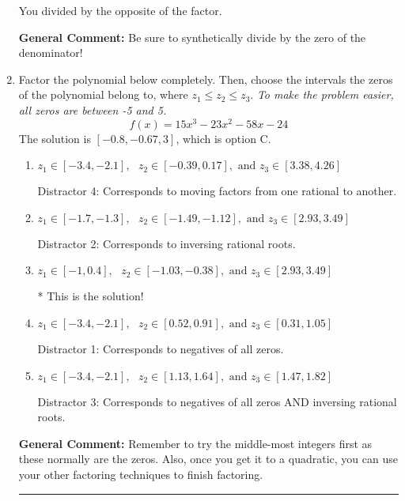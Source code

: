 \documentclass{extbook}[14pt]
\newcommand{\litem}[1]{\item #1

\rule{\textwidth}{0.4pt}}
\begin{document}
\begin{enumerate}
{\begin{enumerate}[label=\Alph*.]
 You divided by the opposite of the factor.
\end{enumerate}

\textbf{General Comment:} Be sure to synthetically divide by the zero of the denominator!
}
\litem{
Factor the polynomial below completely. Then, choose the intervals the zeros of the polynomial belong to, where $z_1 \leq z_2 \leq z_3$. \textit{To make the problem easier, all zeros are between -5 and 5.}
\[ f(x) = 15x^{3} -23 x^{2} -58 x -24 \]The solution is \( [-0.8, -0.67, 3] \), which is option C.\begin{enumerate}[label=\Alph*.]
\item \( z_1 \in [-3.4, -2.1], \text{   }  z_2 \in [-0.39, 0.17], \text{   and   } z_3 \in [3.38, 4.26] \)

 Distractor 4: Corresponds to moving factors from one rational to another.
\item \( z_1 \in [-1.7, -1.3], \text{   }  z_2 \in [-1.49, -1.12], \text{   and   } z_3 \in [2.93, 3.49] \)

 Distractor 2: Corresponds to inversing rational roots.
\item \( z_1 \in [-1, 0.4], \text{   }  z_2 \in [-1.03, -0.38], \text{   and   } z_3 \in [2.93, 3.49] \)

* This is the solution!
\item \( z_1 \in [-3.4, -2.1], \text{   }  z_2 \in [0.52, 0.91], \text{   and   } z_3 \in [0.31, 1.05] \)

 Distractor 1: Corresponds to negatives of all zeros.
\item \( z_1 \in [-3.4, -2.1], \text{   }  z_2 \in [1.13, 1.64], \text{   and   } z_3 \in [1.47, 1.82] \)

 Distractor 3: Corresponds to negatives of all zeros AND inversing rational roots.
\end{enumerate}

\textbf{General Comment:} Remember to try the middle-most integers first as these normally are the zeros. Also, once you get it to a quadratic, you can use your other factoring techniques to finish factoring.
}
\end{enumerate}
\end{document}
